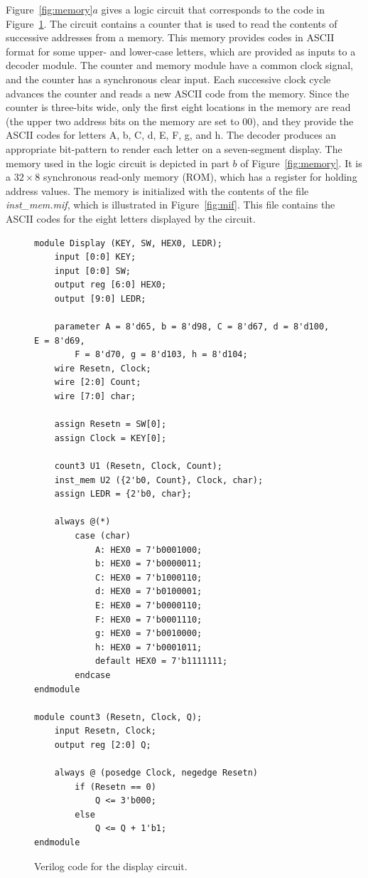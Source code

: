 \documentclass[11pt, twoside, pdftex]{article}
\begin{document}
\noindent
Figure~\ref{fig:memory}$a$ gives a logic circuit that corresponds to the code in 
Figure~\ref{fig:display}. The circuit contains a counter that is used to read the 
contents of successive addresses from a memory. This memory provides codes in ASCII format 
for some upper- and lower-case letters, which are provided as inputs to a decoder module. 
The counter and memory module have a common clock signal, and the counter has a
synchronous clear input. Each successive clock cycle advances the counter and reads 
a new ASCII code from the memory. Since the counter is three-bits wide, only the first 
eight locations in the memory are read (the upper two address bits on the memory are set
to 00), and they provide the ASCII codes for letters A, b, C, d, E, F, g, and h. The 
decoder produces an appropriate bit-pattern to render each letter on a seven-segment display.
The memory used in the logic circuit is depicted in part $b$ of Figure~\ref{fig:memory}. It
is a $32 \times 8$ synchronous read-only memory (ROM), which has a register for holding 
address values. The memory is initialized with the contents of the file {\it inst\_mem.mif},
which is illustrated in Figure~\ref{fig:mif}. This file contains the ASCII codes for the 
eight letters displayed by the circuit.

\lstset{language=Verilog,numbers=none,escapechar=?}
\begin{figure}[h!]
\begin{center}
\begin{minipage}[t]{15 cm}
\begin{lstlisting}[name=display]
module Display (KEY, SW, HEX0, LEDR);
    input [0:0] KEY;
    input [0:0] SW;
    output reg [6:0] HEX0;
    output [9:0] LEDR;	

    parameter A = 8'd65, b = 8'd98, C = 8'd67, d = 8'd100, E = 8'd69, 
        F = 8'd70, g = 8'd103, h = 8'd104;
    wire Resetn, Clock;
    wire [2:0] Count;
    wire [7:0] char;

    assign Resetn = SW[0];
    assign Clock = KEY[0];

    count3 U1 (Resetn, Clock, Count);
    inst_mem U2 ({2'b0, Count}, Clock, char);
    assign LEDR = {2'b0, char};

    always @(*)
        case (char)
            A: HEX0 = 7'b0001000;
            b: HEX0 = 7'b0000011;
            C: HEX0 = 7'b1000110;
            d: HEX0 = 7'b0100001;
            E: HEX0 = 7'b0000110;
            F: HEX0 = 7'b0001110;
            g: HEX0 = 7'b0010000;
            h: HEX0 = 7'b0001011;
            default HEX0 = 7'b1111111;
        endcase
endmodule

module count3 (Resetn, Clock, Q);
    input Resetn, Clock;
    output reg [2:0] Q;

    always @ (posedge Clock, negedge Resetn)
        if (Resetn == 0)
            Q <= 3'b000;
        else
            Q <= Q + 1'b1;
endmodule
\end{lstlisting}
\end{minipage}
\caption{Verilog code for the display circuit.}
\label{fig:display}
\end{center}
\end{figure}
\end{document}
